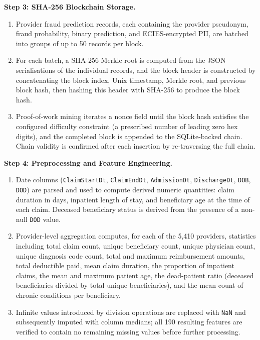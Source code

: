 \vspace{0.5em}
\noindent\textbf{Step 3: SHA-256 Blockchain Storage.}

\begin{enumerate}[label=\roman*.]
  \item Provider fraud prediction records, each containing the provider
  pseudonym, fraud probability, binary prediction, and ECIES-encrypted PII,
  are batched into groups of up to 50 records per block.
  \item For each batch, a SHA-256 Merkle root is computed from the JSON
  serialisations of the individual records, and the block header is constructed
  by concatenating the block index, Unix timestamp, Merkle root, and previous
  block hash, then hashing this header with SHA-256 to produce the block hash.
  \item Proof-of-work mining iterates a nonce field until the block hash satisfies
  the configured difficulty constraint (a prescribed number of leading zero hex
  digits), and the completed block is appended to the SQLite-backed chain. Chain
  validity is confirmed after each insertion by re-traversing the full chain.
\end{enumerate}

\vspace{0.5em}
\noindent\textbf{Step 4: Preprocessing and Feature Engineering.}

\begin{enumerate}[label=\roman*.]
  \item Date columns (\texttt{ClaimStartDt}, \texttt{ClaimEndDt},
  \texttt{AdmissionDt}, \texttt{DischargeDt}, \texttt{DOB}, \texttt{DOD}) are
  parsed and used to compute derived numeric quantities: claim duration in days,
  inpatient length of stay, and beneficiary age at the time of each claim.
  Deceased beneficiary status is derived from the presence of a non-null
  \texttt{DOD} value.
  \item Provider-level aggregation computes, for each of the 5,410 providers,
  statistics including total claim count, unique beneficiary count, unique
  physician count, unique diagnosis code count, total and maximum reimbursement
  amounts, total deductible paid, mean claim duration, the proportion of inpatient
  claims, the mean and maximum patient age, the dead-patient ratio (deceased
  beneficiaries divided by total unique beneficiaries), and the mean count of
  chronic conditions per beneficiary.
  \item Infinite values introduced by division operations are replaced with
  \texttt{NaN} and subsequently imputed with column medians; all 190 resulting
  features are verified to contain no remaining missing values before further
  processing.
\end{enumerate}

